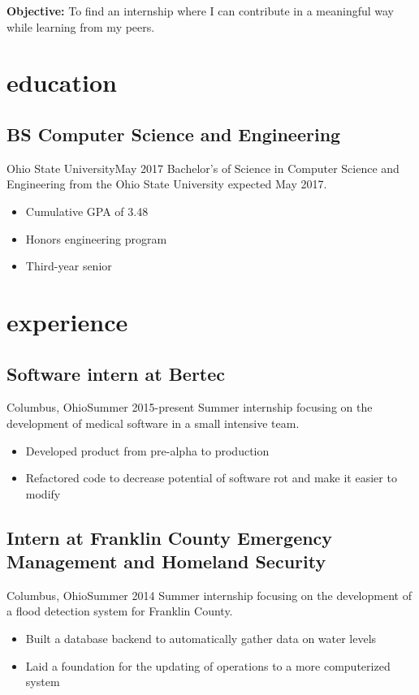 \documentclass[letterpaper,6pt]{cv}
\begin{document}
	\author{Brandon A. Moore}
	\maketitle
	
	\noindent\textbf{\Large{Objective:}} To find an internship where I can contribute in a meaningful way while learning from my peers.

	\section{education}

	\subsection{BS Computer Science and Engineering}{Ohio State University}{May 2017}
			Bachelor's of Science in Computer Science and Engineering from the Ohio State University expected May 2017.
			\begin{itemize}
				\item Cumulative GPA of 3.48
				\item Honors engineering program
				\item Third-year senior
			\end{itemize}

	\section{experience}

	\subsection{Software intern at Bertec}{Columbus, Ohio}{Summer 2015-present}
			Summer internship focusing on the development of medical software in a small intensive team.
			\begin{itemize}
				\item Developed product from pre-alpha to production
				\item Refactored code to decrease potential of software rot and make it easier to modify
			\end{itemize}
	
		\subsection{Intern at Franklin County Emergency\\ Management and Homeland Security}{Columbus, Ohio}{Summer 2014}
			Summer internship focusing on the development of a flood detection system for Franklin County.
			\begin{itemize}
				\item Built a database backend to automatically gather data on water levels
				\item Laid a foundation for the updating of operations to a more computerized system
			\end{itemize}
\end{document}
